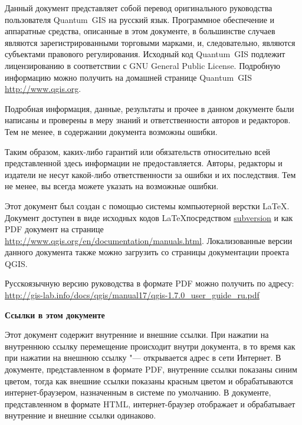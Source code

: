 \frontmatter
\pagestyle{scrplain}
\vspace{1cm}


Данный документ представляет собой перевод оригинального руководства
пользователя Quantum~GIS на русский язык. Программное обеспечение и
аппаратные средства, описанные в этом документе, в большинстве случаев
являются зарегистрированными торговыми марками, и, следовательно, являются
субъектами правового регулирования. Исходный код Quantum~GIS подлежит
лицензированию в соответствии с GNU General Public License. Подробную
информацию можно получить на домашней странице Quantum~GIS
\url{http://www.qgis.org}.
\par\bigskip
Подробная информация, данные, результаты и прочее в данном документе
были написаны и проверены в меру знаний и ответственности авторов и
редакторов. Тем не менее, в содержании документа возможны ошибки.
\par\bigskip
Таким образом, каких-либо гарантий или обязательств
относительно всей представленной здесь информации не предоставляется.
Авторы, редакторы и издатели не несут какой-либо ответственности за ошибки
и их последствия. Тем не менее, вы всегда можете указать на возможные ошибки.
\par\bigskip
Этот документ был создан с помощью системы компьютерной верстки \LaTeX.
Документ доступен в виде исходных кодов \LaTeX посредством
\href{http://wiki.qgis.org/qgiswiki/DocumentationWritersCorner}{subversion}
и как PDF документ на странице\\
\url{http://www.qgis.org/en/documentation/manuals.html}.
Локализованные версии данного документа также можно загрузить со
страницы документации проекта QGIS.

Русскоязычную версию руководства в формате PDF можно получить по адресу:\\
\url{http://gis-lab.info/docs/qgis/manual17/qgis-1.7.0_user_guide_ru.pdf}

\vspace{1cm}
\noindent
\textbf{Ссылки в этом документе}
\par\bigskip
Этот документ содержит внутренние и внешние ссылки. При нажатии на
внутреннюю ссылку перемещение происходит внутри документа, в то время
как при нажатии на внешнюю ссылку "--- открывается адрес в сети Интернет.
В документе, представленном в формате PDF, внутренние ссылки показаны
синим цветом, тогда как внешние ссылки показаны красным цветом и
обрабатываются интернет-браузером, назначенным в системе по умолчанию. В
документе, представленном в формате HTML, интернет-браузер отображает и
обрабатывает внутренние и внешние ссылки одинаково.

